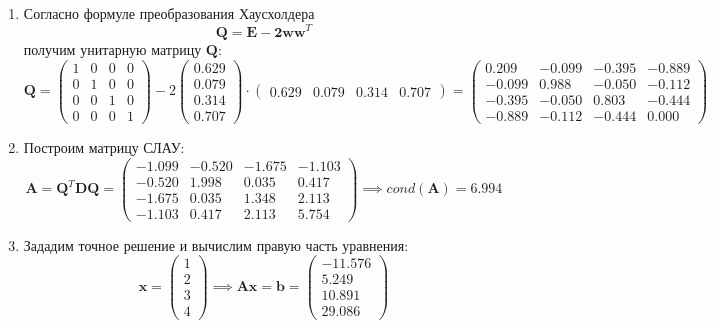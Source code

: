 \begin{enumerate}
\item Согласно формуле преобразования Хаусхолдера
\begin{equation}
    \mathbf{Q = E - 2ww}^T
\end{equation}
получим унитарную матрицу $\mathbf{Q}$:
\begin{equation}
    \mathbf{Q} =
    \begin{pmatrix}
        1 & 0 & 0 & 0 \\
        0 & 1 & 0 & 0 \\
        0 & 0 & 1 & 0 \\
        0 & 0 & 0 & 1
    \end{pmatrix} - 2
   \begin{pmatrix} 0.629\\0.079\\0.314\\0.707\end{pmatrix} \cdot
   \begin{pmatrix} 0.629 & 0.079 & 0.314 & 0.707\end{pmatrix} =
    \begin{pmatrix}
         0.209&  -0.099&  -0.395&  -0.889\\
        -0.099&   0.988&  -0.050&  -0.112\\
        -0.395&  -0.050&   0.803&  -0.444\\
        -0.889&  -0.112&  -0.444&   0.000
    \end{pmatrix}
\end{equation}

\item Построим матрицу СЛАУ:
\begin{equation}
    \mathbf{A}=\mathbf{Q}^T\mathbf{DQ} =
    \begin{pmatrix}
        -1.099& -0.520& -1.675& -1.103\\
        -0.520&  1.998&  0.035&  0.417\\
        -1.675&  0.035&  1.348&  2.113\\
        -1.103&  0.417&  2.113&  5.754
    \end{pmatrix} \implies cond(\mathbf{A}) = \mathbf{6.994}
\end{equation}

\item Зададим точное решение и вычислим правую часть уравнения:
\begin{equation}
    \mathbf{x} =
    \begin{pmatrix}
        1\\ 2\\ 3\\ 4
    \end{pmatrix}\implies
    \mathbf{Ax} = \mathbf{b} =
    \begin{pmatrix}-11.576\\5.249\\10.891\\29.086\end{pmatrix}
\end{equation}
\end{enumerate}

